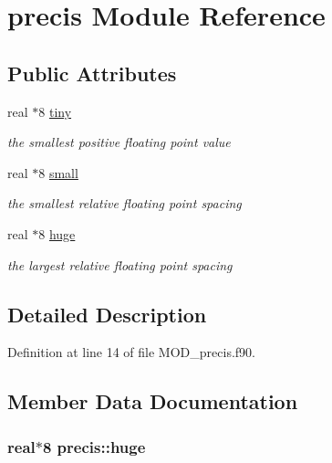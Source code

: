 \hypertarget{classprecis}{\section{precis Module Reference}
\label{classprecis}
}
\subsection*{Public Attributes}
\begin{DoxyCompactItemize}
\item 
real $\ast$8 \hyperlink{classprecis_a316560daad6a1f214299dbec5e6005e9}{tiny}
\begin{DoxyCompactList}\small\item\em the smallest positive floating point value \end{DoxyCompactList}\item 
real $\ast$8 \hyperlink{classprecis_add2dd4c8ce112246ec177d911dadabfd}{small}
\begin{DoxyCompactList}\small\item\em the smallest relative floating point spacing \end{DoxyCompactList}\item 
real $\ast$8 \hyperlink{classprecis_acd871fc5ec9ce332fc63397a45f13f8d}{huge}
\begin{DoxyCompactList}\small\item\em the largest relative floating point spacing \end{DoxyCompactList}\end{DoxyCompactItemize}


\subsection{Detailed Description}


Definition at line 14 of file M\-O\-D\-\_\-precis.\-f90.



\subsection{Member Data Documentation}
\hypertarget{classprecis_acd871fc5ec9ce332fc63397a45f13f8d}{
\subsubsection[{huge}]{\setlength{\rightskip}{0pt plus 5cm}real$\ast$8 precis\-::huge}}\label{classprecis_acd871fc5ec9ce332fc63397a45f13f8d}



